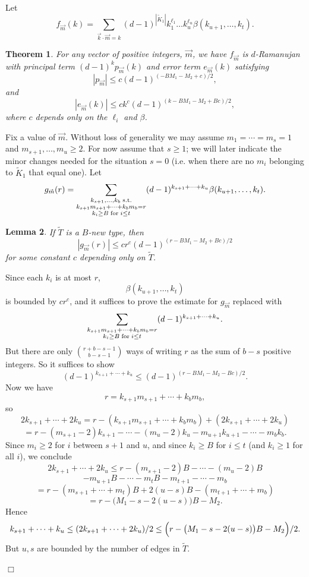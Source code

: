 \documentclass[12pt]{article}
\newtheorem{theorem}{Theorem}[section]
\newtheorem{lemma}[theorem]{Lemma}
\newcommand{\dtreelike}{{$d$-Ramanujan}}
\newcommand{\proof}{{\par\noindent {\bf Proof}\space\space}}
\newcommand{\proofbox}{\begin{flushright}$\Box$\end{flushright}}
\begin{document}
Let 
$$
f_{\vec m}(k)=\sum_{\vec k\cdot\vec m=k}(d-1)^{|\widetilde K_1|}
k_1^{\ell_1}\ldots k_u^{\ell_u}\beta(k_{u+1},\ldots,k_t).
$$
\begin{theorem}\label{th:f_vecm_est}
For any vector of positive integers, $\vec m$, we have
$f_{\vec m}$ is {\dtreelike} with principal term $(d-1)^kp_{\vec m}(k)$
and error term $e_{\vec m}(k)$ satisfying
$$
|p_{\vec m}| \le c(d-1)^{(-BM_1-M_2+c)/2},
$$
and 
$$
|e_{\vec m}(k)| \le ck^c (d-1)^{(k-BM_1-M_2+Bc)/2},
$$
where $c$ depends only on the $\ell_i$ and $\beta$.
\end{theorem}
\proof Fix a value of $\vec m$.  Without loss of generality we may assume
$m_1=\cdots=m_s=1$ and $m_{s+1},\ldots,m_u\ge 2$.  For now assume that
$s\ge 1$; we will later indicate the minor changes needed for the situation
$s=0$ (i.e. when there are no $m_i$ belonging to $\widetilde K_1$ that
equal one).
Let
$$
g_{\vec m}(r)= \sum_{\substack{ k_{s+1},\ldots,k_b{\rm \;s.t.}\\
k_{s+1}m_{s+1}+\cdots+k_bm_b=r\\  k_i\ge B\;{\rm for}\; i\le t }}
(d-1)^{k_{s+1}+\cdots+k_u}\beta(k_{u+1},\ldots,k_t).
$$
\begin{lemma}\label{lm:crucial_B_type_est}
If $\widetilde T$ is a $B$-new type, then
$$
|g_{\vec m}(r)|\le cr^c (d-1)^{(r-BM_1-M_2+Bc)/2}
$$
for some constant $c$ depending only on $\widetilde T$.
\end{lemma}
\proof
Since each $k_i$ is at most $r$,
$$
\beta(k_{u+1},\ldots,k_t)
$$
is bounded by $cr^c$, and
it suffices to prove the 
estimate for $g_{\vec m}$ replaced with
$$
\sum_{\substack{k_{s+1}m_{s+1}+\cdots+k_bm_b=r\\ 
k_i\ge B\;{\rm for}\; i\le t }}
(d-1)^{k_{s+1}+\cdots+k_u}.
$$
But there are only $\binom{r+b-s-1}{b-s-1}$ ways of writing
$r$ as the sum of $b-s$ positive integers.  So it suffices to show
$$
(d-1)^{k_{s+1}+\cdots+k_u} \le (d-1)^{(r-BM_1-M_2-Bc)/2}.
$$
Now we have 
$$
r = k_{s+1}m_{s+1}+\cdots+k_bm_b,
$$
so
$$
2k_{s+1}+\cdots+2k_u =
r - (k_{s+1}m_{s+1}+\cdots+k_bm_b)+(2k_{s+1}+\cdots+2k_u)
$$
$$
=r - (m_{s+1}-2)k_{s+1} - \cdots - (m_u-2)k_u -
m_{u+1}k_{u+1} - \cdots - m_bk_b.
$$
Since $m_i\ge 2$ for $i$ between $s+1$ and $u$, and since $k_i\ge B$ for
$i\le t$ (and $k_i\ge 1$ for all $i$), we conclude
$$
2k_{s+1}+\cdots+2k_u \le r - (m_{s+1}-2)B - \cdots - (m_u-2)B
$$
$$
-m_{u+1}B - \cdots - m_tB-m_{t+1}-\cdots-m_b
$$
$$
= r-(m_{s+1}+\cdots+m_t)B+2(u-s)B-(m_{t+1}+\cdots+m_b)
$$
$$
= r - \bigl(M_1-s-2(u-s)\bigr)B-M_2.
$$
Hence
$$
k_{s+1}+\cdots+k_u\le (2k_{s+1}+\cdots+2k_u)/2
\le \Bigl(r - \bigl(M_1-s-2(u-s)\bigr)B-M_2\Bigr)/2.
$$
But $u,s$ are bounded by the number of edges in $\widetilde T$.
\proofbox
\end{document}
